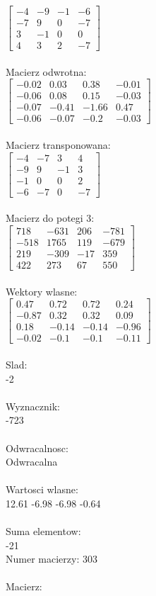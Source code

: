 \documentclass[a4paper,12pt]{article}
\begin{document}
$\begin{bmatrix} -4&-9&-1&-6\\-7&9&0&-7\\3&-1&0&0\\4&3&2&-7 \end{bmatrix}$
\\
\\
Macierz odwrotna:\\

$\begin{bmatrix} -0.02&0.03&0.38&-0.01\\-0.06&0.08&0.15&-0.03\\-0.07&-0.41&-1.66&0.47\\-0.06&-0.07&-0.2&-0.03 \end{bmatrix}$
\\
\\
Macierz transponowana:\\

$\begin{bmatrix} -4&-7&3&4\\-9&9&-1&3\\-1&0&0&2\\-6&-7&0&-7 \end{bmatrix}$
\\
\\
Macierz do potegi 3:\\

$\begin{bmatrix} 718&-631&206&-781\\-518&1765&119&-679\\219&-309&-17&359\\422&273&67&550 \end{bmatrix}$
\\
\\
Wektory wlasne:\\

$\begin{bmatrix} 0.47&0.72&0.72&0.24\\-0.87&0.32&0.32&0.09\\0.18&-0.14&-0.14&-0.96\\-0.02&-0.1&-0.1&-0.11 \end{bmatrix}$
\\
\\
Slad:\\
-2
\\
\\
Wyznacznik:\\
-723
\\
\\
Odwracalnosc:\\
Odwracalna
\\
\\
Wartosci wlasne:\\
12.61 -6.98 -6.98 -0.64
\\
\\
Suma elementow:\\
-21
\\
\newpage
Numer macierzy:
303
\\
\\
Macierz:\\
\end{document}
